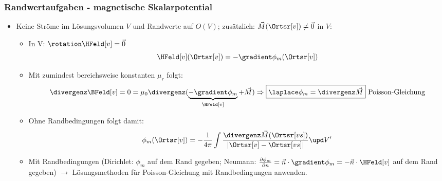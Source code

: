 \begin{frame}
  \frametitle{Randwertaufgaben - magnetische Skalarpotential}
  \begin{itemize}[<+->]
  \item Keine Ströme im Lösungsvolumen $V$ und Randwerte auf $O(V)$; \alert{zusätzlich:} $\vec{M}(\Ortsr[v])\ne \vec{0}$ in $V$:
      \begin{itemize}[<+->]
      \item In V: $\rotation\HFeld[v] = \vec{0}$
        $$
        \HFeld[v](\Ortsr[v]) = -\gradient \phi_m (\Ortsr[v]) 
        $$
      \item Mit zumindest bereichsweise konstanten $\mu_r$ folgt:
        $$
        \divergenz \BFeld[v] = 0 = \mu_0\divergenz ( \underbrace{-\gradient \phi_m }_{\HFeld[v]}+\vec{M}) \Rightarrow \boxed{\laplace \phi_m = \divergenz \vec{M}} \text{ Poisson-Gleichung}
        $$
      \item Ohne Randbedingungen folgt damit:
        $$
        \phi_m (\Ortsr[v]) = -\frac{1}{4\pi} \int \frac{\divergenz \vec{M} (\Ortsr[vs]) }{|\Ortsr[v]-\Ortsr[vs]|} \upd V'
        $$
        \item Mit Randbedingungen (Dirichlet: $\phi_m$ auf dem Rand gegeben; Neumann: $\frac{\partial\phi_m}{\partial n} = \vec{n}\cdot\gradient\phi_m = - \vec{n}\cdot\HFeld[v]$ auf dem Rand gegeben) $\to$ Lösungsmethoden für Poisson-Gleichung mit Randbedingungen anwenden.
\end{itemize}
\end{itemize}
\end{frame}




   
